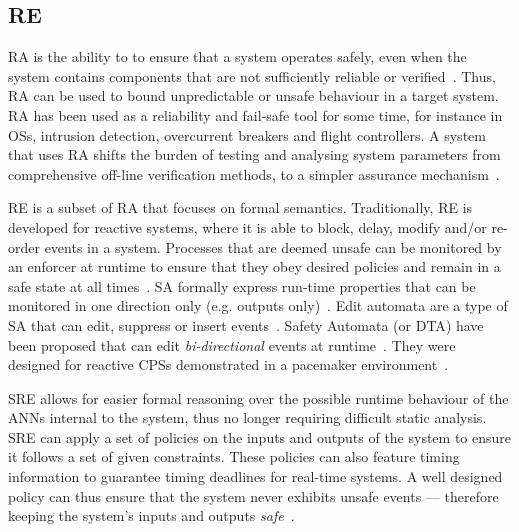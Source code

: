 \subsection{\acf{RE}}
\ac{RA} is the ability to to ensure that a system operates safely, even when the system contains components that are not sufficiently reliable or verified~\cite{rta-cps}. 
Thus, \ac{RA} can be used to bound unpredictable or unsafe behaviour in a target system. 
\ac{RA} has been used as a reliability and fail-safe tool for some time, for instance in \acp{OS}, intrusion detection, overcurrent breakers and flight controllers. 
A system that uses \ac{RA} shifts the burden of testing and analysing system parameters from comprehensive off-line verification methods, to a simpler assurance mechanism~\cite{rta-cps}. 

\ac{RE} is a subset of \ac{RA} that focuses on formal semantics.
Traditionally, \ac{RE} is developed for reactive systems, where it is able to block, delay, modify and/or re-order events in a system. 
Processes that are deemed unsafe can be monitored by an enforcer at runtime to ensure that they obey desired policies and remain in a safe state at all times~\cite{theoryRE}. 
\ac{SA} formally express run-time properties that can be monitored in one direction only (e.g. outputs only)~\cite{enfsafepol}. 
Edit automata are a type of \ac{SA} that can edit, suppress or insert events~\cite{editautomata}. 
Safety Automata (or \ac{DTA}) have been proposed that can edit \textit{bi-directional} events at runtime~\cite{recps}. 
They were designed for reactive \acp{CPS} demonstrated in a pacemaker environment~\cite{recps}. 

\ac{SRE} allows for easier formal reasoning over the possible runtime behaviour of the \acp{ANN} internal to the system, thus no longer requiring difficult static analysis.
\ac{SRE} can apply a set of policies on the inputs and outputs of the system to ensure it follows a set of given constraints. %
These policies can also feature timing information to guarantee timing deadlines for real-time systems.
A well designed policy can thus ensure that the system never exhibits unsafe events --- therefore keeping the system's inputs and outputs \textit{safe}~\cite{EstSafeCriteria2003}. 

